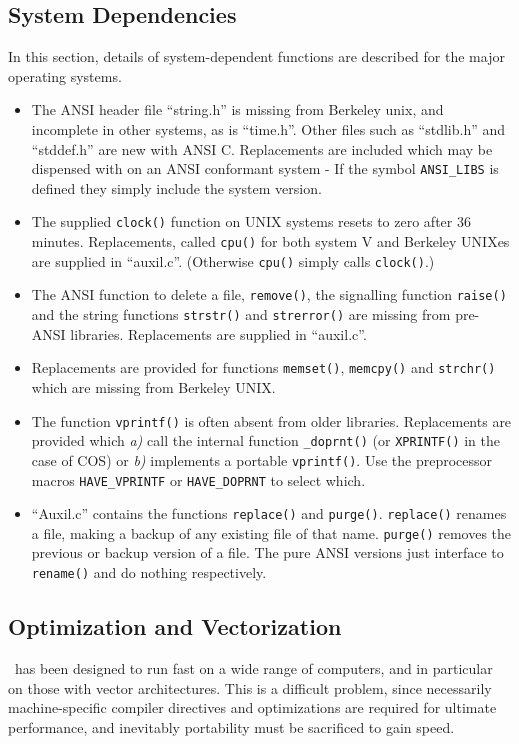 \subsection{System Dependencies}
In this section, details of system-dependent functions are described
for the major operating systems.  
\begin{itemize}
\item The ANSI header file ``string.h'' is missing
from Berkeley unix, and incomplete in other systems, as is ``time.h''.
Other files such as ``stdlib.h'' and ``stddef.h'' are new with ANSI C.
Replacements are included which may be dispensed with on an ANSI
conformant system - If the symbol \verb'ANSI_LIBS' is defined they
simply include the system version.
\item The supplied \verb'clock()' function on UNIX systems resets to
zero after 36 minutes.  Replacements, called \verb'cpu()' for both
system V and Berkeley UNIXes are supplied in ``auxil.c''. (Otherwise
\verb'cpu()' simply calls \verb'clock()'.)
\item The ANSI function to delete a file, \verb'remove()', the
signalling function \verb'raise()' and the string  functions
\verb'strstr()' and \verb'strerror()' are missing from pre-ANSI
libraries.  Replacements are supplied in ``auxil.c''. 
\item Replacements are provided for functions \verb'memset()',
\verb'memcpy()' and \verb'strchr()' which are missing from Berkeley UNIX.
\item The function \verb'vprintf()' is often absent from older
libraries. Replacements are provided which {\em a)\/} call the internal
function \verb'_doprnt()' (or  \verb'XPRINTF()' in the case of COS) or
{\em b)\/} implements a portable \verb'vprintf()'.  Use the preprocessor
macros  \verb'HAVE_VPRINTF' or \verb'HAVE_DOPRNT' to select which.
\item ``Auxil.c'' contains the functions \verb'replace()' and \verb'purge()'.
\verb'replace()' renames a file, making a backup of any existing file
of that name. \verb'purge()' removes the previous or backup version of
a file.  The pure ANSI versions just interface to \verb'rename()' and
do nothing respectively.
\end{itemize}

\subsection{Optimization and Vectorization}
\moldy\  has been designed to run fast on a wide range of computers, and
in particular on those with vector architectures. This is a difficult
problem, since necessarily machine-specific compiler directives and
optimizations are required for ultimate performance, and inevitably
portability must be sacrificed to gain speed.

